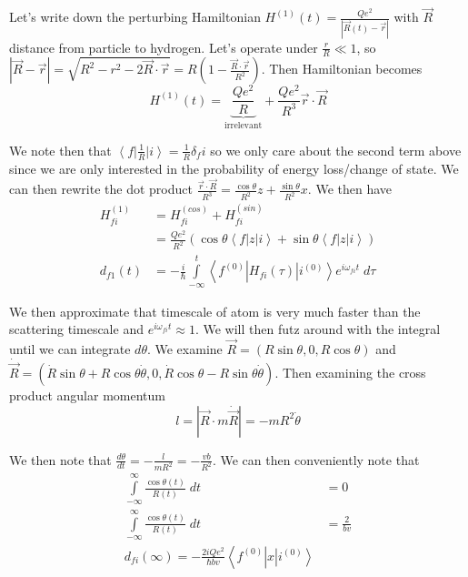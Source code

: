 \documentclass[10pt]{report}
\newcommand{\bra}[1]{\left<#1\right|}
\newcommand{\ket}[1]{\left|#1\right>}
\newcommand{\rd}[2]{\frac{d#1}{d#2}}
\newcommand{\abs}[1]{\left|#1\right|}
\begin{document}
Let's write down the perturbing Hamiltonian $H^{(1)}(t) = \frac{Qe^2}{\abs{\vec{R}(t) - \vec{r}}}$ with $\vec{R}$ distance from particle to hydrogen. Let's operate under $\frac{r}{R} \ll 1$, so $\abs{\vec{R} - \vec{r}} = \sqrt{R^2 - r^2 - 2\vec{R}\cdot \vec{r}} = R\left( 1 - \frac{\vec{R}\cdot \vec{r}}{R^2} \right)$. Then Hamiltonian becomes
\begin{equation}
    H^{(1)}(t) = \underbrace{\frac{Qe^2}{R}}_{\text{irrelevant}} + \frac{Qe^2}{R^3}\vec{r}\cdot \vec{R}
    \label{1.H}
\end{equation}

We note then that $\bra{f}\frac{1}{R}\ket{i} = \frac{1}{R}\delta_fi$ so we only care about the second term above since we are only interested in the probability of energy loss/change of state. We can then rewrite the dot product $\frac{\vec{r}\cdot \vec{R}}{R^3} = \frac{\cos \theta}{R^2}z + \frac{\sin \theta}{R^2}x$. We then have
\begin{align}
    H_{fi}^{(1)} &= H_{fi}^{(cos)} + H_{fi}^{(sin)}\\
    &= \frac{Qe^2}{R^2}\left( \cos \theta \bra{f}z\ket{i} + \sin \theta \bra{f}z\ket{i} \right)\\
    d_{f1}(t) &= -\frac{i}{\hbar}\displaystyle\int\limits_{-\infty}^{t}\bra{f^{(0)}}H_{fi}(\tau)\ket{i^{(0)}}e^{i\omega_{fi}t}\; d\tau
\end{align}

We then approximate that timescale of atom is very much faster than the scattering timescale and $e^{i\omega_{fi}t} \approx 1$. We will then futz around with the integral until we can integrate $d\theta$. We examine $\vec{R} = (R\sin \theta, 0, R\cos \theta)$ and $\dot{\vec{R}} = (\dot{R}\sin \theta + R\cos \theta \dot{\theta}, 0, \dot{R}\cos\theta - R\sin\theta\dot{\theta})$. Then examining the cross product angular momentum
$$l =\abs{\vec{R}\cdot m\dot{\vec{R}}} = -mR^2\dot{\theta}$$

We then note that $\rd{\theta}{t} = -\frac{l}{mR^2} = -\frac{vb}{R^2}$. We can then conveniently note that
\begin{align}
    \displaystyle\int\limits_{-\infty}^{\infty}\frac{\cos \theta(t)}{R(t)}\;dt &= 0\\
    \displaystyle\int\limits_{-\infty}^{\infty}\frac{\cos \theta(t)}{R(t)}\;dt &= \frac{2}{bv}\\
    d_{fi}(\infty) = -\frac{2iQe^2}{\hbar bv}\bra{f^{(0)}}x\ket{i^{(0)}}
    \label{1.31.penultimateFormula}
\end{align}
\end{document}
